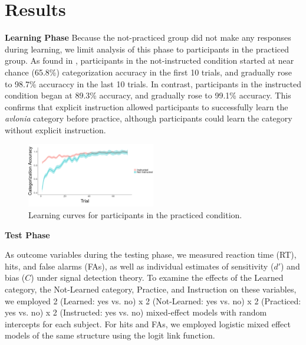 \documentclass[twocolumn]{svjour3}          %
\begin{document}
\section*{Results}
\label{results}

\noindent\textbf{Learning Phase }
Because the not-practiced group did not make any responses during
learning, we limit analysis of this phase to participants in the
practiced group. As found in \citet{DeBrigard2017}, participants in
the not-instructed condition started at near chance (65.8\%)
categorization accuracy in the first 10 trials, and gradually rose to
98.7\% accuraccy in the last 10 trials. In contrast, participants in
the instructed condition began at 89.3\% accuracy, and gradually rose
to 99.1\% accuracy. This confirms that explicit instruction allowed
participants to successfully learn the \emph{avlonia} category before
practice, although participants could learn the category without
explicit instruction.

\begin{figure}
  \includegraphics[width=0.5\textwidth]{learning.png}
  \caption{Learning curves for participants in the practiced
    condition.}
  \label{fig:learning}
\end{figure}

\noindent\textbf{Test Phase }

As outcome variables during the testing phase, we measured reaction
time (RT), hits, and false alarms (FAs), as well as individual
estimates of sensitivity ($d'$) and bias ($C$) under signal detection
theory. To examine the effects of the Learned category, the
Not-Learned category, Practice, and Instruction on these variables, we
employed 2 (Learned: yes vs. no) x 2 (Not-Learned: yes vs. no) x 2
(Practiced: yes vs. no) x 2 (Instructed: yes vs. no) mixed-effect
models with random intercepts for each subject. For hits and FAs, we
employed logistic mixed effect models of the same structure using the
logit link function.
\end{document}
